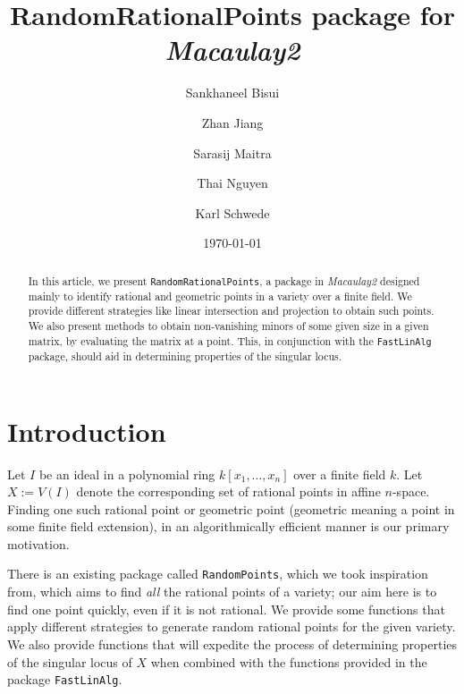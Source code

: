 \documentclass[11pt]{amsart}
\theoremstyle{definition}
\begin{document}
\title{{RandomRationalPoints} package for \emph{Macaulay2}}
\author{Sankhaneel Bisui}
\address{Tulane University}
\author{Zhan Jiang}
\address{University of Michigan}
\author{Sarasij Maitra}
\address{University of Virginia}
\author{Thai Nguyen}
\address{Tulane University}
\author{Karl Schwede}
\address{Department of Mathematics, University of Utah, 155 S 1400 E Room 233, Salt Lake City, UT, 84112}
\date{\today}

\begin{abstract}
  In this article, we present {\tt RandomRationalPoints}, a package in \emph{Macaulay2} designed mainly to identify rational and geometric points in a variety over a finite field. We provide different strategies like linear intersection and projection to obtain such points. We also present methods to obtain non-vanishing minors of some given size in a given matrix, by evaluating the matrix at a point.  This, in conjunction with the {\tt FastLinAlg} package, should aid in determining properties of the singular locus.
\end{abstract}



\maketitle

\section{Introduction}
Let $I$ be an ideal in a polynomial ring $k[x_1,\dots, x_n]$ over a finite field $k$. Let $X:=V(I)$ denote the corresponding set of rational points in affine $n$-space. Finding one such rational point or geometric point (geometric meaning a point in some finite field extension), in an algorithmically efficient manner is our primary motivation. 

There is an existing package called {\tt RandomPoints}, which we took inspiration from, which aims to find \emph{all} the rational points of a variety; our aim here is to find one point quickly, even if it is not rational.  
We provide some functions that apply different strategies to generate random rational points for the given variety. We also provide functions that will expedite the process of determining properties of the singular locus of $X$ when combined with the functions provided in the package {\tt FastLinAlg}.  
\end{document}
